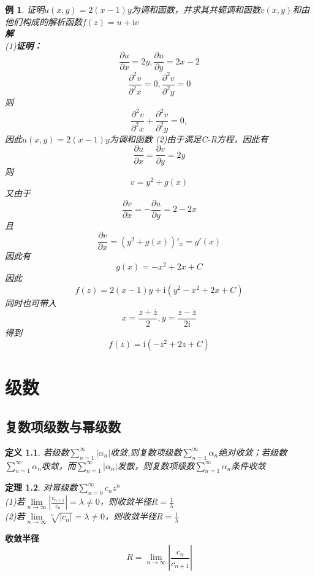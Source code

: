 \documentclass[12pt, a4paper, twoside]{ctexbook}
\newtheorem{theorem}{定理}[section]
\newtheorem{definition}[theorem]{定义}
\newtheorem{example}[theorem]{例}
\begin{document}
\begin{example}
	证明$u\left(x,y\right)=2\left(x-1\right)y$为调和函数，并求其共轭调和函数$v\left(x,y\right)$和由他们构成的解析函数$f\left(z\right)=u+\mathrm{i}v$\\
	\hspace*{1em}\textbf{解}\\
	\hspace*{2em}(1)\textbf{证明：}
	$$
	\frac{\partial u}{\partial x}=2y,
	\frac{\partial u}{\partial y}=2x-2
	$$
	$$
	\frac{\partial ^2 v}{\partial ^2 x}=0,
	\frac{\partial ^2 v}{\partial ^2 y}=0
	$$
	\hspace*{2em}则
	$$
	\frac{\partial ^2 v}{\partial ^2 x}+\frac{\partial ^2 v}{\partial ^2 y}=0,
	$$
	\hspace*{2em}因此$u\left(x,y\right)=2\left(x-1\right)y$为调和函数
	\newpage
	(2)由于满足C-R方程，因此有
	$$
	\frac{\partial u}{\partial x}=\frac{\partial v}{\partial y}=2y
	$$
	\hspace*{2em}则
	$$
	v=y^2+g\left(x\right)
	$$
	\hspace*{2em}又由于
	$$
	\frac{\partial v}{\partial x}=-\frac{\partial u}{\partial y}=2-2x
	$$
	\hspace*{2em}且
	$$
	\frac{\partial v}{\partial x}=\left(y^2+g\left(x\right)\right)'_x=g'\left(x\right)
	$$
	\hspace*{2em}因此有
	$$
	g\left(x\right)=-x^2+2x+C
	$$
	\hspace*{2em}因此
	$$
	f\left(z\right)=2\left(x-1\right)y+\mathrm{i}\left(y^2-x^2+2x+C\right)
	$$
	\hspace*{2em}同时也可带入
	$$
	x=\frac{z+\overline{z}}{2},y=\frac{z-\overline{z}}{2\mathrm{i}}
	$$
	\hspace*{2em}得到
	$$
	f\left(z\right)=\mathrm{i}\left(-z^2+2z+C\right)
	$$
\end{example}

\chapter{级数}
\newpage
\section{复数项级数与幂级数}
\begin{definition}
	若级数$\sum\limits_{n=1}^{\infty}{\left|\alpha_n\right|}$收敛,则复数项级数$\sum\limits_{n=1}^{\infty}{\alpha_n}$绝对收敛；若级数$\sum\limits_{n=1}^{\infty}{\alpha_n}$收敛，而$\sum\limits_{n=1}^{\infty}{\left|\alpha_n\right|}$发散，则复数项级数$\sum\limits_{n=1}^{\infty}{\alpha_n}$条件收敛\\
\end{definition}
\begin{theorem}
	对幂级数$\sum\limits_{n=0}^{\infty}{c_nz^n}$\\
	(1)若$\lim\limits_{n\to\infty}{\left|\frac{c_{n+1}}{c_n}\right|}=\lambda\neq0$，则收敛半径$R=\frac{1}{\lambda}$\\
	(2)若$\lim\limits_{n\to\infty}{\sqrt[n]{\left|c_n\right|}}=\lambda\neq0$，则收敛半径$R=\frac{1}{\lambda}$
\end{theorem}
\textbf{收敛半径}
$$
R=\lim\limits_{n\to\infty}{\left|\frac{c_n}{c_{n+1}}\right|}
$$
\end{document}
